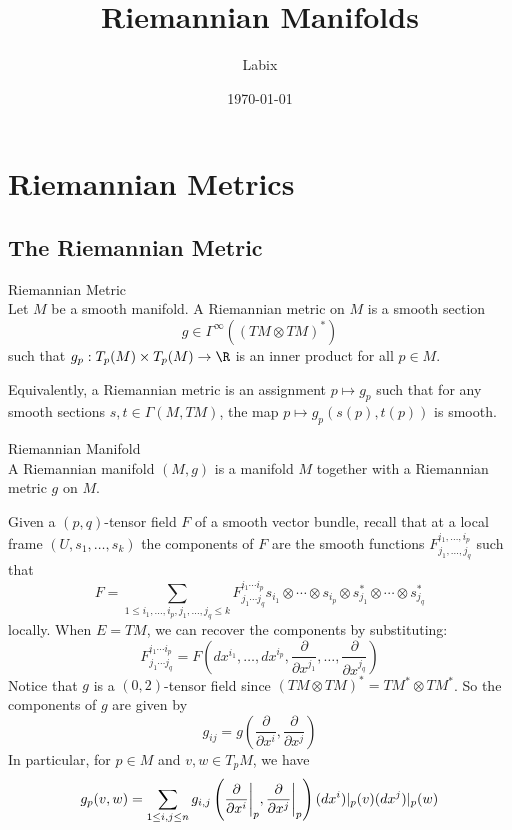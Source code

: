 \documentclass[a4paper]{article}
\title{Riemannian Manifolds}
\author{Labix}
\date{\today}
\begin{document}
\maketitle
\begin{abstract}
\end{abstract}
\pagebreak
\tableofcontents
\pagebreak

\section{Riemannian Metrics}
\subsection{The Riemannian Metric}
\begin{defn}{Riemannian Metric}{}\\
Let $M$ be a smooth manifold. A Riemannian metric on $M$ is a smooth section $$g\in\Gamma^\infty((TM\otimes TM)^\ast)$$ such that $g_p:T_p(M)\times T_p(M)\to\R$ is an inner product for all $p\in M$. 
\end{defn}

Equivalently, a Riemannian metric is an assignment $p\mapsto g_p$ such that for any smooth sections $s,t\in\Gamma(M,TM)$, the map $p\mapsto g_p(s(p),t(p))$ is smooth. 

\begin{defn}{Riemannian Manifold}{}\\
A Riemannian manifold $(M,g)$ is a manifold $M$ together with a Riemannian metric $g$ on $M$. 
\end{defn}

Given a $(p,q)$-tensor field $F$ of a smooth vector bundle, recall that at a local frame $(U,s_1,\dots,s_k)$ the components of $F$ are the smooth functions $F^{i_1,\dots,i_p}_{j_1,\dots,j_q}$ such that $$F=\sum_{1\leq i_1,\dots,i_p,j_1,\dots,j_q\leq k}F^{i_1\cdots i_p}_{j_1\cdots j_q} s_{i_1}\otimes\cdots\otimes s_{i_p}\otimes s_{j_1}^\ast\otimes\cdots\otimes s_{j_q}^\ast$$ locally. When $E=TM$, we can recover the components by substituting: $$F^{i_1\cdots i_p}_{j_1\cdots j_q}=F\left(dx^{i_1},\dots,dx^{i_p},\frac{\partial}{\partial x^{j_1}},\dots,\frac{\partial}{\partial x^{j_q}}\right)$$ Notice that $g$ is a $(0,2)$-tensor field since $(TM\otimes TM)^\ast=TM^\ast\otimes TM^\ast$. So the components of $g$ are given by $$g_{ij}=g\left(\frac{\partial}{\partial x^i},\frac{\partial}{\partial x^j}\right)$$ In particular, for $p\in M$ and $v,w\in T_pM$, we have $$g_p(v,w)=\sum_{1\leq i,j\leq n}g_{i,j}\left(\frac{\partial}{\partial x^i}\bigg{|}_p,\frac{\partial}{\partial x^j}\bigg{|}_p\right)(dx^i)|_p(v)(dx^j)|_p(w)$$
\end{document}
